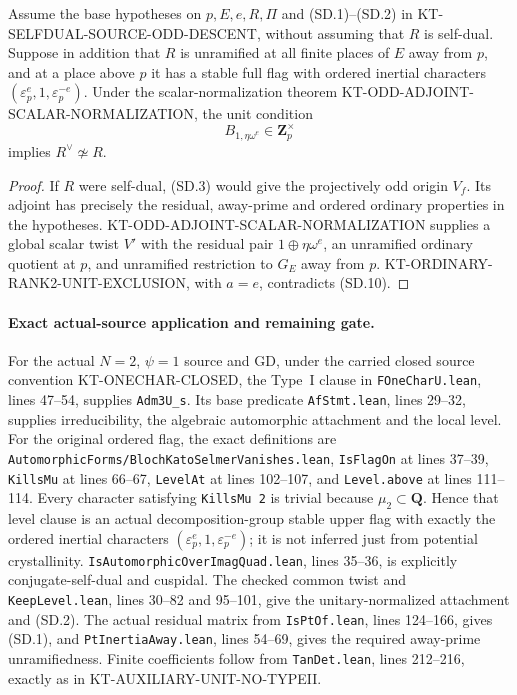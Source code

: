 \begin{corollary}
Assume the base hypotheses on $p,E,e,R,\Pi$ and (SD.1)--(SD.2)
in KT-SELFDUAL-SOURCE-ODD-DESCENT, without assuming that $R$ is
self-dual.  Suppose in addition that $R$ is unramified at all finite places of $E$
away from $p$, and at a place above $p$ it has a stable full flag
with ordered inertial characters
$(\varepsilon_p^e,1,\varepsilon_p^{-e})$.
Under the scalar-normalization theorem
KT-ODD-ADJOINT-SCALAR-NORMALIZATION, the unit condition
\[
                          B_{1,\eta\omega^e}\in\mathbf Z_p^\times
                                                               \tag{SD.10}
\]
implies $R^\vee\not\simeq R$.
\end{corollary}

\begin{proof}
If $R$ were self-dual, (SD.3) would give the projectively odd
origin $V_f$.  Its adjoint has precisely the residual,
away-prime and ordered ordinary properties in the hypotheses.
KT-ODD-ADJOINT-SCALAR-NORMALIZATION supplies a global scalar
twist $V'$ with the residual pair $1\oplus\eta\omega^e$,
an unramified ordinary quotient at $p$, and unramified
restriction to $G_E$ away from $p$.
KT-ORDINARY-RANK2-UNIT-EXCLUSION, with $a=e$, contradicts
(SD.10).
\end{proof}

\paragraph{Exact actual-source application and remaining gate.}
For the actual $N=2$, $\psi=1$ source and GD, under the carried
closed source convention KT-ONECHAR-CLOSED, the Type~I clause
in \texttt{FOneCharU.lean}, lines 47--54, supplies
\texttt{Adm3U\_s}.  Its base predicate
\texttt{AfStmt.lean}, lines 29--32, supplies irreducibility,
the algebraic automorphic attachment and the local level.
For the original ordered flag, the exact definitions are
\texttt{AutomorphicForms/BlochKatoSelmerVanishes.lean},
\texttt{IsFlagOn} at lines 37--39, \texttt{KillsMu} at
lines 66--67, \texttt{LevelAt} at lines 102--107, and
\texttt{Level.above} at lines 111--114.
Every character satisfying \texttt{KillsMu 2} is trivial because
$\mu_2\subset\mathbf Q$.  Hence that level clause is an actual
decomposition-group stable upper flag with exactly the ordered
inertial characters $(\varepsilon_p^e,1,\varepsilon_p^{-e})$;
it is not inferred just from potential crystallinity.
\texttt{IsAutomorphicOverImagQuad.lean}, lines 35--36, is
explicitly conjugate-self-dual and cuspidal.
The checked common twist and \texttt{KeepLevel.lean},
lines 30--82 and 95--101, give the unitary-normalized attachment
and (SD.2).  The actual residual matrix from
\texttt{IsPtOf.lean}, lines 124--166, gives (SD.1), and
\texttt{PtInertiaAway.lean}, lines 54--69, gives the required
away-prime unramifiedness.  Finite coefficients follow from
\texttt{TanDet.lean}, lines 212--216, exactly as in
KT-AUXILIARY-UNIT-NO-TYPEII.

